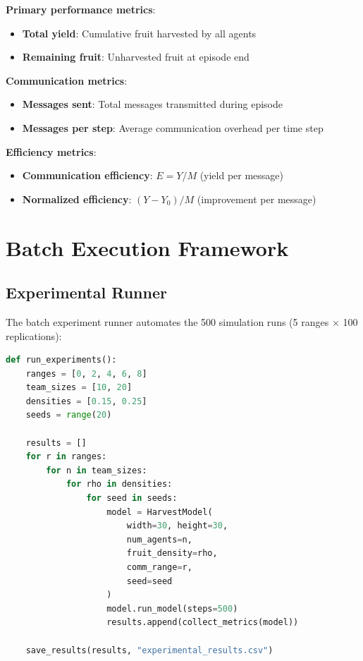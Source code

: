 \textbf{Primary performance metrics}:
\begin{itemize}
    \item \textbf{Total yield}: Cumulative fruit harvested by all agents
    \item \textbf{Remaining fruit}: Unharvested fruit at episode end
\end{itemize}

\textbf{Communication metrics}:
\begin{itemize}
    \item \textbf{Messages sent}: Total messages transmitted during episode
    \item \textbf{Messages per step}: Average communication overhead per time step
\end{itemize}

\textbf{Efficiency metrics}:
\begin{itemize}
    \item \textbf{Communication efficiency}: $E = Y / M$ (yield per message)
    \item \textbf{Normalized efficiency}: $(Y - Y_0) / M$ (improvement per message)
\end{itemize}

\section{Batch Execution Framework}

\subsection{Experimental Runner}

The batch experiment runner automates the 500 simulation runs (5 ranges × 100 replications):

\begin{lstlisting}[language=Python, caption=Batch execution framework]
def run_experiments():
    ranges = [0, 2, 4, 6, 8]
    team_sizes = [10, 20]
    densities = [0.15, 0.25]
    seeds = range(20)

    results = []
    for r in ranges:
        for n in team_sizes:
            for rho in densities:
                for seed in seeds:
                    model = HarvestModel(
                        width=30, height=30,
                        num_agents=n,
                        fruit_density=rho,
                        comm_range=r,
                        seed=seed
                    )
                    model.run_model(steps=500)
                    results.append(collect_metrics(model))

    save_results(results, "experimental_results.csv")
\end{lstlisting}

